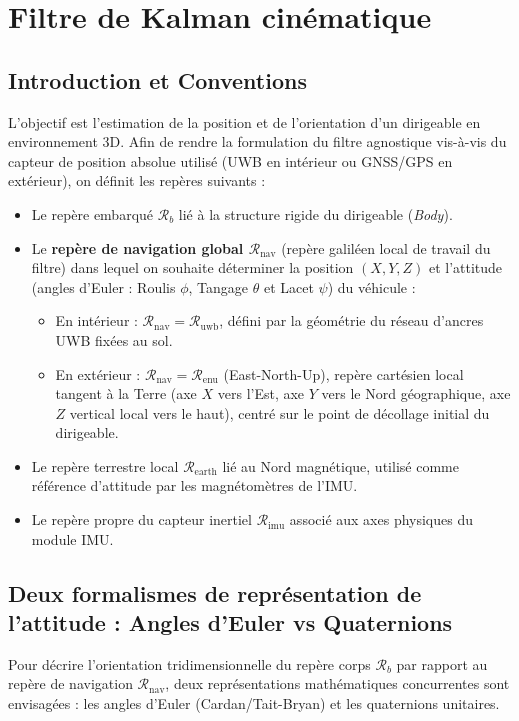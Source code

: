 \documentclass[../Formulations_Kalman.tex]{subfiles}
\begin{document}
\section{Filtre de Kalman cinématique}

\subsection{Introduction et Conventions}
L'objectif est l'estimation de la position et de l'orientation d'un dirigeable en environnement 3D. Afin de rendre la formulation du filtre agnostique vis-à-vis du capteur de position absolue utilisé (UWB en intérieur ou GNSS/GPS en extérieur), on définit les repères suivants :
\begin{itemize}
    \item Le repère embarqué $\mathcal{R}_b$ lié à la structure rigide du dirigeable (\textit{Body}).
    \item Le \textbf{repère de navigation global $\mathcal{R}_{\text{nav}}$} (repère galiléen local de travail du filtre) dans lequel on souhaite déterminer la position $(X, Y, Z)$ et l'attitude (angles d'Euler : Roulis $\phi$, Tangage $\theta$ et Lacet $\psi$) du véhicule :
    \begin{itemize}
        \item En intérieur : $\mathcal{R}_{\text{nav}} = \mathcal{R}_{\text{uwb}}$, défini par la géométrie du réseau d'ancres UWB fixées au sol.
        \item En extérieur : $\mathcal{R}_{\text{nav}} = \mathcal{R}_{\text{enu}}$ (East-North-Up), repère cartésien local tangent à la Terre (axe $X$ vers l'Est, axe $Y$ vers le Nord géographique, axe $Z$ vertical local vers le haut), centré sur le point de décollage initial du dirigeable.
    \end{itemize}
    \item Le repère terrestre local $\mathcal{R}_{\text{earth}}$ lié au Nord magnétique, utilisé comme référence d'attitude par les magnétomètres de l'IMU.
    \item Le repère propre du capteur inertiel $\mathcal{R}_{\text{imu}}$ associé aux axes physiques du module IMU.
\end{itemize}

\subsection{Deux formalismes de représentation de l'attitude : Angles d'Euler vs Quaternions}
Pour décrire l'orientation tridimensionnelle du repère corps $\mathcal{R}_b$ par rapport au repère de navigation $\mathcal{R}_{\text{nav}}$, deux représentations mathématiques concurrentes sont envisagées : les angles d'Euler (Cardan/Tait-Bryan) et les quaternions unitaires.
\end{document}
